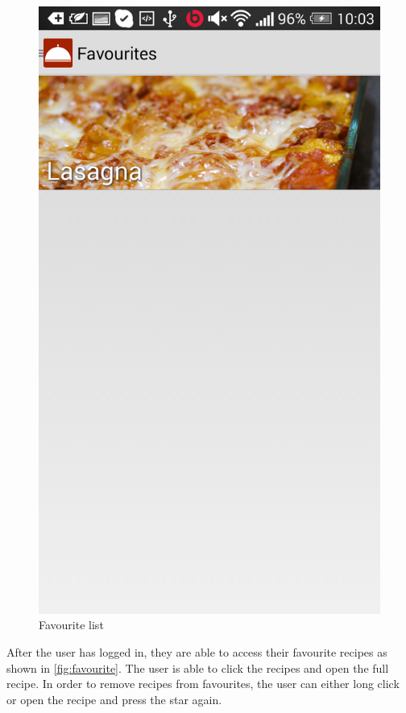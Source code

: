 \begin{figure}[H]
\centering
\begin{minipage}[t]{0.5\columnwidth}
\centering
\includegraphics[width=0.7\columnwidth]{img/screenshots/finalfavourite.png}
\caption{Favourite list\label{fig:favourite}}
\end{minipage}
\end{figure}

 After the user has logged in, they are able to access their favourite recipes as shown in \autoref{fig:favourite}. The user is able to click the recipes and open the full recipe. In order to remove recipes from favourites, the user can either long click or open the recipe and press the star again.